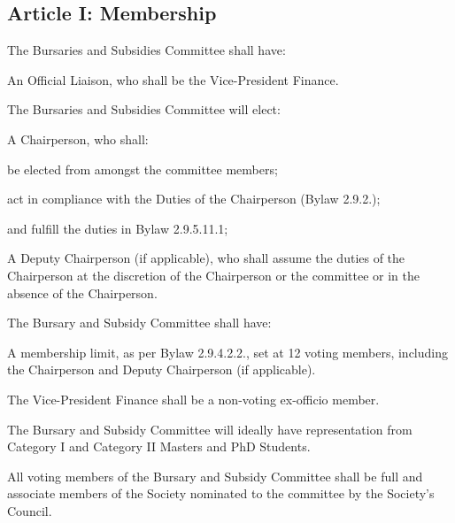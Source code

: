 \subsection{Article I: Membership}
\begin{longenum}[ label*=\thesubsection.\arabic*., align=left] 
	\item The Bursaries and Subsidies Committee shall have:
		\begin{longenum}[ label*=\arabic*., align=left] 
		\item An Official Liaison, who shall be the Vice-President Finance.
		\end{longenum}
	\item The Bursaries and Subsidies Committee will elect:
		\begin{longenum}[ label*=\arabic*., align=left]
		\item A Chairperson, who shall:
			\begin{longenum}[ label*=\arabic*., align=left]
			\item be elected from amongst the committee members;
			\item act in compliance with the Duties of the Chairperson (Bylaw 2.9.2.);
			\item and fulfill the duties in Bylaw 2.9.5.11.1;
			\item A Deputy Chairperson (if applicable), who shall assume the duties of the Chairperson at the discretion of the Chairperson or the committee or in the absence of the Chairperson.
			\end{longenum}
		\end{longenum}
	\item The Bursary and Subsidy Committee shall have:
		\begin{longenum}[ label*=\arabic*., align=left]
		\item A membership limit, as per Bylaw 2.9.4.2.2., set at 12 voting members, including the Chairperson and Deputy Chairperson (if applicable).
		\end{longenum}
	\item The Vice-President Finance shall be a non-voting ex-officio member.
	\item The Bursary and Subsidy Committee will ideally have representation from Category I and Category II Masters and PhD Students.
	\item All voting members of the Bursary and Subsidy Committee shall be full and associate members of the Society nominated to the committee by the Society’s Council.     
\end{longenum}

